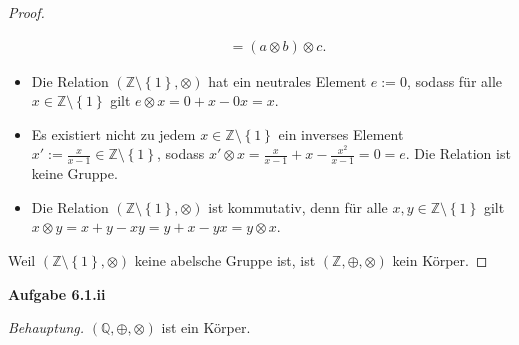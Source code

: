 \documentclass[12pt]{extarticle}
\newcommand{\mg}[1]{\mathbb{#1}}
\begin{document}
\begin{proof}
\begin{itemize}
\begin{align*}
  &= (a \otimes b) \otimes c.
\end{align*}
\item Die Relation
  \((\mg{Z} \setminus \left\{ 1 \right\}, \otimes)\) hat ein
  neutrales Element \(e:=0\), sodass für alle
  \(x \in \mg{Z} \setminus \left\{ 1 \right\}\) gilt
  \(e \otimes x = 0+ x - 0x =x\).
\item Es existiert nicht zu jedem
  \(x \in \mg{Z} \setminus \left\{ 1 \right\}\) ein inverses Element
  \(x':=\frac{x}{x-1} \in \mg{Z} \setminus \left\{ 1 \right\}\),
  sodass \(x' \otimes x= \frac{x}{x-1} + x - \frac{x^2}{x-1} = 0 =e\).
  Die Relation ist keine Gruppe.
\item Die Relation
  \((\mg{Z} \setminus \left\{ 1 \right\}, \otimes)\) ist kommutativ,
  denn für alle \(x, y \in \mg{Z} \setminus \left\{ 1 \right\}\)
  gilt \(x \otimes y = x + y - xy = y+x - yx = y \otimes x\).
\end{itemize}

Weil \((\mg{Z} \setminus \left\{ 1 \right\}, \otimes)\) keine
abelsche Gruppe ist, ist \((\mg{Z}, \oplus, \otimes)\) kein Körper.
\end{proof}

\textbf{Aufgabe 6.1.ii}

\textit{Behauptung.}  \((\mg{Q}, \oplus, \otimes)\) ist ein Körper.
\end{document}
